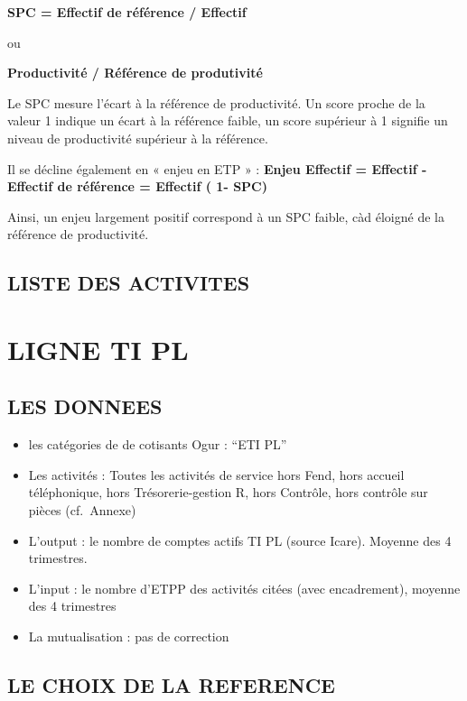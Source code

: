 \documentclass[
]{book}
\begin{document}
\textbf{SPC = Effectif de référence / Effectif}

ou

\textbf{Productivité / Référence de produtivité}

Le SPC mesure l'écart à la référence de productivité. Un score proche de la valeur 1 indique un écart à la référence faible, un score supérieur à 1 signifie un niveau de productivité supérieur à la référence.

Il se décline également en « enjeu en ETP » :
\textbf{Enjeu Effectif = Effectif - Effectif de référence = Effectif ( 1- SPC)}

Ainsi, un enjeu largement positif correspond à un SPC faible, càd éloigné de la référence de productivité.

\hypertarget{liste-des-activites-1}{%
\section{LISTE DES ACTIVITES}\label{liste-des-activites-1}}

\hypertarget{ligne-ti-pl}{%
\chapter{LIGNE TI PL}\label{ligne-ti-pl}}

\hypertarget{les-donnees-8}{%
\section{LES DONNEES}\label{les-donnees-8}}

\begin{itemize}
\item
  les catégories de de cotisants Ogur : ``ETI PL''
\item
  Les activités :
  Toutes les activités de service hors Fend, hors accueil téléphonique, hors Trésorerie-gestion R, hors Contrôle, hors contrôle sur pièces (cf.~Annexe)
\item
  L'output : le nombre de comptes actifs TI PL (source Icare). Moyenne des 4 trimestres.
\item
  L'input : le nombre d'ETPP des activités citées (avec encadrement), moyenne des 4 trimestres
\item
  La mutualisation : pas de correction
\end{itemize}

\hypertarget{le-choix-de-la-reference-4}{%
\section{LE CHOIX DE LA REFERENCE}\label{le-choix-de-la-reference-4}}
\end{document}
